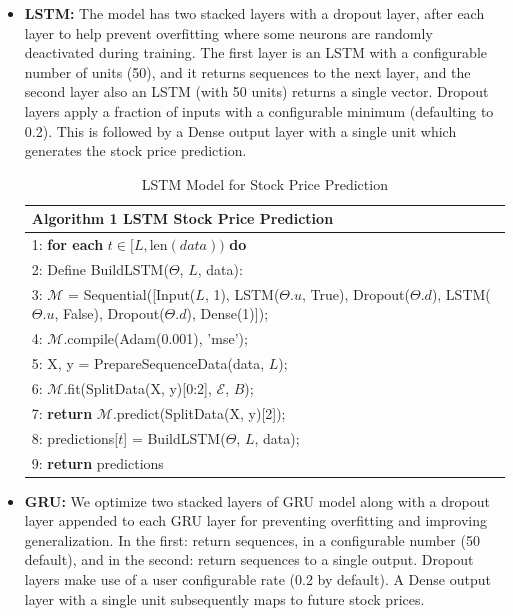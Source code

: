 \begin{itemize}
    \item \textbf{LSTM:} The model has two stacked layers with a dropout layer, after each layer to help prevent overfitting where some neurons are randomly deactivated during training. The first layer is an LSTM with a configurable number of units (50), and it returns sequences to the next layer, and the second layer also an LSTM (with 50 units) returns a single vector. Dropout layers apply a fraction of inputs with a configurable minimum (defaulting to 0.2). This is followed by a Dense output layer with a single unit which generates the stock price prediction.
    
    \begin{table}[h]
    \small
    \centering
    \begin{tabular}{|p{10cm}|}
    \hline
    \textbf{Algorithm 1 LSTM Stock Price Prediction} \\
    \hline
    1: \textbf{for each} $t \in [L, \text{len}(data))$ \textbf{do} \\
    2: \quad Define BuildLSTM($\Theta$, $L$, data): \\
    3: \quad\quad $\mathcal{M}$ = Sequential([Input($L$, 1), LSTM($\Theta.u$, True), Dropout($\Theta.d$), LSTM($\Theta.u$, False), Dropout($\Theta.d$), Dense(1)]); \\
    4: \quad\quad $\mathcal{M}$.compile(Adam(0.001), 'mse'); \\
    5: \quad\quad X, y = PrepareSequenceData(data, $L$); \\
    6: \quad\quad $\mathcal{M}$.fit(SplitData(X, y)[0:2], $\mathcal{E}$, $B$); \\
    7: \quad\quad \textbf{return} $\mathcal{M}$.predict(SplitData(X, y)[2]); \\
    8: \quad predictions[$t$] = BuildLSTM($\Theta$, $L$, data); \\
    9: \textbf{return} predictions \\
    \hline
    \end{tabular}
    \caption{LSTM Model for Stock Price Prediction}
    \label{tab:lstm_predictor}
    \end{table}
    

    \item \textbf{GRU: } We optimize two stacked layers of GRU model along with a dropout layer appended to each GRU layer for preventing overfitting and improving generalization. In the first: return sequences, in a configurable number (50 default), and in the second: return sequences to a single output. Dropout layers make use of a user configurable rate (0.2 by default). A Dense output layer with a single unit subsequently maps to future stock prices.
    

\end{itemize}
